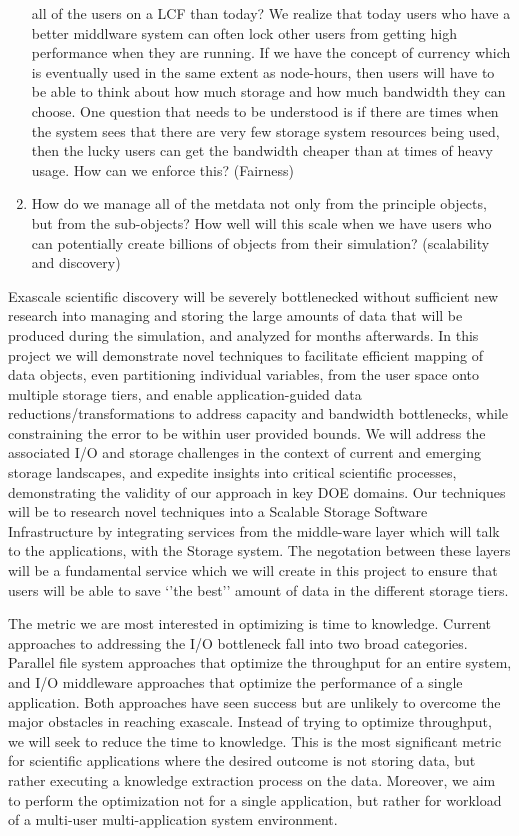 \begin{enumerate}
  all of the users on a LCF than today? We realize that today users who have
  a better middlware system can often lock other users from getting high
  performance when they are running. If we have the concept of currency
  which is eventually used in the same extent as node-hours, then users will
  have to be able to think about how much storage and how much bandwidth
  they can choose. One question that needs to be understood is if there are
  times when the system sees that there are very few storage system
  resources being used, then the lucky users can get the bandwidth cheaper
  than at times of heavy usage. How can we enforce this? (Fairness)
\item How do we manage all of the metdata not only from the principle
  objects, but from the sub-objects? How well will this scale when we have
  users who can potentially create billions of objects from their
  simulation? (scalability and discovery)
\end{enumerate}

Exascale scientific discovery will be severely bottlenecked without
sufficient new research into managing and storing the large amounts of data
that will be produced during the simulation, and analyzed for months
afterwards.
%
In this project we will demonstrate novel techniques to facilitate efficient
mapping of data objects, even partitioning individual variables, from the
user space onto multiple storage tiers, and enable application-guided data
reductions/transformations to address capacity and bandwidth bottlenecks,
while constraining the error to be within user provided bounds.
%
We will address the associated I/O and storage challenges in the context of
current and emerging storage landscapes, and expedite insights into critical
scientific processes, demonstrating the validity of our approach in key DOE
domains. Our techniques will be to research novel techniques into a Scalable
Storage Software Infrastructure by integrating services from the middle-ware
layer which will talk to the applications, with the Storage system. The
negotation between these layers will be a fundamental service which we will
create in this project to ensure that users will be able to save `'the
best'' amount of data in the different storage tiers.

The metric we are most interested in optimizing is time to knowledge.
Current approaches to addressing the I/O bottleneck fall into two broad
categories. Parallel file system approaches that optimize the throughput for
an entire system, and I/O middleware approaches that optimize the
performance of a single application. Both approaches have seen success but
are unlikely to overcome the major obstacles in reaching exascale. Instead
of trying to optimize throughput, we will seek to reduce the time to
knowledge. This is the most significant metric for scientific applications
where the desired outcome is not storing data, but rather executing a
knowledge extraction process on the data. Moreover, we aim to perform the
optimization not for a single application, but rather for workload of a
multi-user multi-application system environment.

